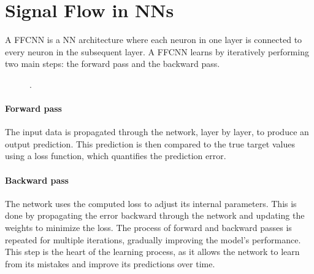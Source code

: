 \section*{Signal Flow in \aclp*{NN}}

A \ac{FFCNN} is a \ac{NN} architecture where each neuron in one layer is connected to every neuron in the subsequent layer. A \ac{FFCNN} learns by iteratively performing two main steps: the forward pass and the backward pass.

\begin{figure}[h]
    \centering
    \caption{.}
    \label{fig:fcnn}
\end{figure}

\paragraph{Forward pass} The input data is propagated through the network, layer by layer, to produce an output prediction. This prediction is then compared to the true target values using a loss function, which quantifies the prediction error.

\paragraph{Backward pass} The network uses the computed loss to adjust its internal parameters. This is done by propagating the error backward through the network and updating the weights to minimize the loss. The process of forward and backward passes is repeated for multiple iterations, gradually improving the model's performance. This step is the heart of the learning process, as it allows the network to learn from its mistakes and improve its predictions over time.
